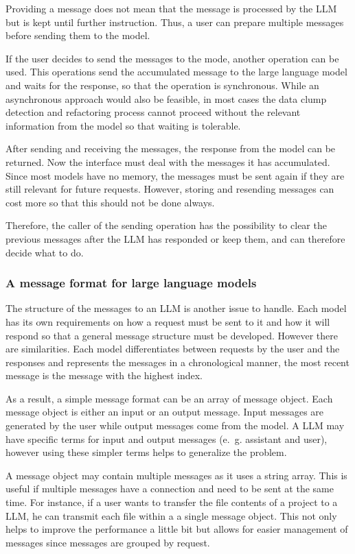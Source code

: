 Providing a message does not mean that the message is processed by the \ac{LLM} but is kept until further instruction. Thus, a user can prepare multiple messages before sending them to the model.

If the user decides to send the messages to the mode, another operation can be used. This operations send the accumulated message to the large language model and waits for the response, so that the operation is synchronous. While an asynchronous approach would also be feasible, in most cases the data clump detection and refactoring process cannot proceed without the relevant information from the model so that waiting is tolerable. 

After sending and receiving the messages, the response from the model can be returned. Now the interface must deal with the messages it has accumulated. Since most models have no memory, the messages must be sent again if they are still relevant for future requests. However, storing and resending messages can cost more so that this should not be done always.

Therefore, the caller of the sending operation has the possibility to clear the previous messages after the \ac{LLM} has responded or keep them, and can therefore decide what to do.

\subsubsection{A message format for large language models} \label{sec:llm_msg_structure}
The structure of the messages to an \ac{LLM} is another issue to handle. Each model has its own requirements on how a request must be sent to it and how it will respond so that a general message structure must be developed. However there are similarities. Each model differentiates between requests by the user and the responses and represents the messages in a chronological manner, the most recent message is the message with the highest index. 

As a result, a simple message format can be an array of message object. Each message object is either an input or an output message. Input messages are generated by the user while output messages come from the model. A \ac{LLM} may have specific terms for input and output messages (e.~g. assistant and user), however using these simpler terms helps to generalize the problem.

A message object may contain multiple messages as it uses a string array. This is useful if multiple messages have a connection and need to be sent at the same time. For instance, if a user wants to transfer the file contents of a project to a \ac{LLM}, he can transmit each file within a a single message object. This not only helps to improve the performance a little bit but allows for easier management of messages since messages are grouped by request. 

